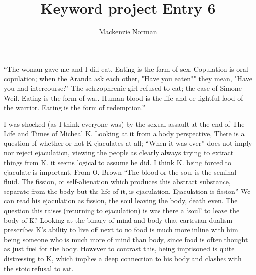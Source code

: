 \documentclass{article}
\title{Keyword project Entry 6}
\author{Mackenzie Norman}
\begin{document}
\maketitle 
``The woman gave me and I did eat. Eating is the form of sex. Copulation is oral copulation; when the Aranda ask each other, "Have you eaten?" they mean, "Have you had intercourse?" The schizophrenic girl refused to eat; the case of Simone Weil. Eating is the form of war. Human blood is the life and de lightful food of the warrior. Eating is the form of redemption.''

I was shocked (as I think everyone was) by the sexual assault at the end of The Life and Times of Micheal K. Looking at it from a body perspective, There is a question of whether or not K ejaculates at all; ``When it was over'' does not imply nor reject ejaculation, viewing the people as clearly always trying to extract things from K. it seems logical to assume he did.  I think K. being forced to ejaculate is important, From O. Brown ``The blood or the soul is the seminal fluid. The fission, or self-alienation which produces this abstract substance, separate from the body but the life of it, is ejaculation. Ejaculation is fission'' We can read his ejaculation as fission, the soul leaving the body, death even. The question this raises (returning to ejaculation) is was there a `soul' to leave the body of K? Looking at the binary of mind and body that cartesian dualism prescribes K's ability to live off next to no food is much more inline with him being someone who is much more of mind than body, since food is often thought as just fuel for the body. However to contrast this, being imprisoned is quite distressing to K, which implies a deep connection to his body and clashes with the stoic refusal to eat.
\end{document}
